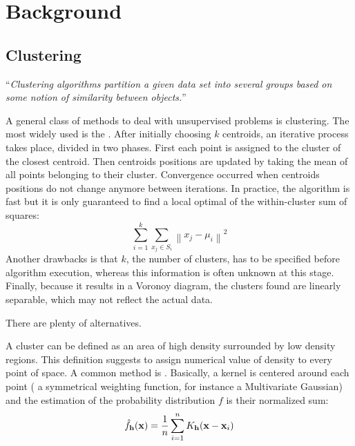 \chapter{Background}
\label{ch:background}

\section{Clustering}

\enquote{\emph{Clustering algorithms partition a given data set into several groups based on some notion of similarity between objects.}}

A general class of methods to deal with unsupervised problems is clustering. The most widely used is the  \autocite{kmeans67}. After initially choosing $k$ centroids, an iterative process takes place, divided in two phases. First each point is assigned to the cluster of the closest centroid. Then centroids positions are updated by taking the mean of all points belonging to their cluster. Convergence occurred when centroids positions do not change anymore between iterations. In practice, the algorithm is fast but it is only guaranteed to find a local optimal of the within-cluster sum of squares: \[ \sum_{i=1}^{k} \sum_{ x_j \in S_i} \left\| x_j - \mu_i \right\|^2 \] Another drawbacks is that $k$, the number of clusters, has to be specified before algorithm execution, whereas this information is often unknown at this stage. Finally, because it results in a Voronoy diagram, the clusters found are linearly separable, which may not reflect the actual data.

There are plenty of alternatives.

A cluster can be defined as an area of high density surrounded by low density regions. This definition suggests to assign numerical value of density to every point of space. A common method is   \autocite{KDE56}. Basically, a kernel is centered around each point (\ie{} a symmetrical weighting function, for instance a Multivariate Gaussian) and the estimation of the probability distribution $f$ is their normalized sum:
\[ \hat{f}_\bold{h}(\bold{x})= \frac{1}{n} \sum_{i=1}^n K_\bold{h} (\bold{x} - \bold{x}_i) \]

